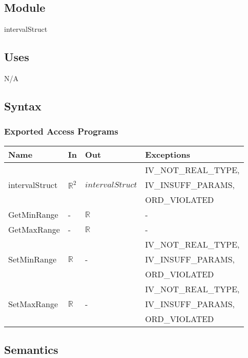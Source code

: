 \documentclass[12pt, titlepage]{article}
\begin{document}
\subsection{Module}

intervalStruct

\subsection{Uses}

N/A

\subsection{Syntax}

\subsubsection{Exported Access Programs}

\begin{center}
	\begin{tabular}{p{3cm} p{3cm} p{3cm} p{5cm}}
		\hline
		\textbf{Name} & \textbf{In} & \textbf{Out} & \textbf{Exceptions} \\
		\hline
		\multirow{3}{3cm}{intervalStruct} & \multirow{3}{3cm}{$\mathbb{R}^2$} & 
		\multirow{3}{4cm}{$intervalStruct$} & 
		IV\_NOT\_REAL\_TYPE, \\
		 &  &  & IV\_INSUFF\_PARAMS, \\
		  &  &  & ORD\_VIOLATED \\
		GetMinRange & - & $\mathbb{R}$ & - \\
		GetMaxRange & - & $\mathbb{R}$ & - \\
		\multirow{3}{3cm}{SetMinRange} & \multirow{3}{3cm}{$\mathbb{R}$} & 
		\multirow{3}{3cm}{-} & IV\_NOT\_REAL\_TYPE, \\
		 &  &  & IV\_INSUFF\_PARAMS, \\
		  &  &  & ORD\_VIOLATED \\
		\multirow{3}{3cm}{SetMaxRange} & \multirow{3}{3cm}{$\mathbb{R}$} & 
		\multirow{3}{3cm}{-} & IV\_NOT\_REAL\_TYPE, \\
		 &  &  & IV\_INSUFF\_PARAMS, \\
		   &  &  & ORD\_VIOLATED \\
		\hline
	\end{tabular}
\end{center}

\subsection{Semantics}
\end{document}
